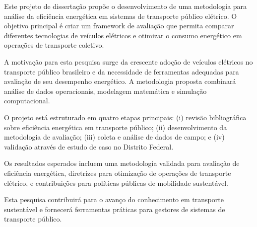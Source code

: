 \documentclass[qualificacao-mestrado,onehalfspacing,12pt,hyperref]{UnB-PPGT}
\begin{document}
\pretextual

\capa
\folhaderosto
\folhadeaprovacao

\begin{resumo}
Este projeto de dissertação propõe o desenvolvimento de uma metodologia para análise da eficiência energética em sistemas de transporte público elétrico. O objetivo principal é criar um framework de avaliação que permita comparar diferentes tecnologias de veículos elétricos e otimizar o consumo energético em operações de transporte coletivo.

A motivação para esta pesquisa surge da crescente adoção de veículos elétricos no transporte público brasileiro e da necessidade de ferramentas adequadas para avaliação de seu desempenho energético. A metodologia proposta combinará análise de dados operacionais, modelagem matemática e simulação computacional.

O projeto está estruturado em quatro etapas principais: (i) revisão bibliográfica sobre eficiência energética em transporte público; (ii) desenvolvimento da metodologia de avaliação; (iii) coleta e análise de dados de campo; e (iv) validação através de estudo de caso no Distrito Federal.

Os resultados esperados incluem uma metodologia validada para avaliação de eficiência energética, diretrizes para otimização de operações de transporte elétrico, e contribuições para políticas públicas de mobilidade sustentável.

Esta pesquisa contribuirá para o avanço do conhecimento em transporte sustentável e fornecerá ferramentas práticas para gestores de sistemas de transporte público.
\end{resumo}
\end{document}
